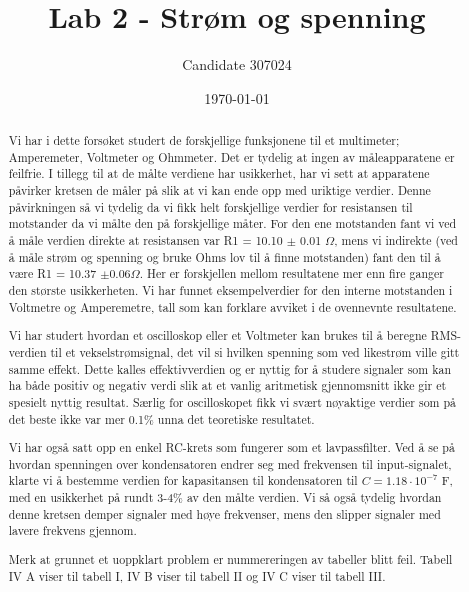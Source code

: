 \documentclass[reprint, english,notitlepage]{revtex4-1}  %
\begin{document}
\title{Lab 2 - Strøm og spenning}
\date{\today}
\author{Candidate 307024}


\newpage

\begin{abstract}
Vi har i dette forsøket studert de forskjellige funksjonene til et multimeter; Amperemeter, Voltmeter og Ohmmeter. Det er tydelig at ingen av måleapparatene er feilfrie. I tillegg til at de målte verdiene har usikkerhet, har vi sett at apparatene påvirker kretsen de måler på slik at vi kan ende opp med uriktige verdier. Denne påvirkningen så vi tydelig da vi fikk helt forskjellige verdier for resistansen til motstander da vi målte den på forskjellige måter. For den ene motstanden fant vi ved å måle verdien direkte at resistansen var R1 = 10.10 $\pm$ 0.01 $\Omega$, mens vi indirekte (ved å måle strøm og spenning og bruke Ohms lov til å finne motstanden) fant den til å være R1 = 10.37 $\pm 0.06 \Omega$. Her er forskjellen mellom resultatene mer enn fire ganger den største usikkerheten. Vi har funnet eksempelverdier for den interne motstanden i Voltmetre og Amperemetre, tall som kan forklare avviket i de ovennevnte resultatene.

Vi har studert hvordan et oscilloskop eller et Voltmeter kan brukes til å beregne RMS-verdien til et vekselstrømsignal, det vil si hvilken spenning som ved likestrøm ville gitt samme effekt. Dette kalles effektivverdien og er nyttig for å studere signaler som kan ha både positiv og negativ verdi slik at et vanlig aritmetisk gjennomsnitt ikke gir et spesielt nyttig resultat. Særlig for oscilloskopet fikk vi svært nøyaktige verdier som på det beste ikke var mer 0.1\% unna det teoretiske resultatet.

Vi har også satt opp en enkel RC-krets som fungerer som et lavpassfilter. Ved å se på hvordan spenningen over kondensatoren endrer seg med frekvensen til input-signalet, klarte vi å bestemme verdien for kapasitansen til kondensatoren til $C = 1.18 \cdot 10^{-7}$ F, med en usikkerhet på rundt 3-4\% av den målte verdien. Vi så også tydelig hvordan denne kretsen demper signaler med høye frekvenser, mens den slipper signaler med lavere frekvens gjennom.

Merk at grunnet et uoppklart problem er nummereringen av tabeller blitt feil. Tabell IV A viser til tabell I, IV B viser til tabell II og IV C viser til tabell III.

\end{abstract}
\maketitle                                %
\end{document}
